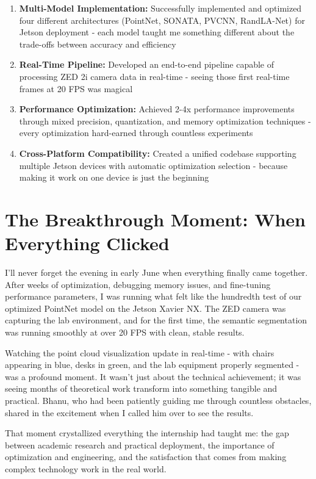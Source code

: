 \documentclass[12pt,a4paper]{report}
\begin{document}
\begin{enumerate}
    \item \textbf{Multi-Model Implementation:} Successfully implemented and optimized four different architectures (PointNet, SONATA, PVCNN, RandLA-Net) for Jetson deployment - each model taught me something different about the trade-offs between accuracy and efficiency
    \item \textbf{Real-Time Pipeline:} Developed an end-to-end pipeline capable of processing ZED 2i camera data in real-time - seeing those first real-time frames at 20 FPS was magical
    \item \textbf{Performance Optimization:} Achieved 2-4x performance improvements through mixed precision, quantization, and memory optimization techniques - every optimization hard-earned through countless experiments
    \item \textbf{Cross-Platform Compatibility:} Created a unified codebase supporting multiple Jetson devices with automatic optimization selection - because making it work on one device is just the beginning
\end{enumerate}

\section{The Breakthrough Moment: When Everything Clicked}

I'll never forget the evening in early June when everything finally came together. After weeks of optimization, debugging memory issues, and fine-tuning performance parameters, I was running what felt like the hundredth test of our optimized PointNet model on the Jetson Xavier NX. The ZED camera was capturing the lab environment, and for the first time, the semantic segmentation was running smoothly at over 20 FPS with clean, stable results.

Watching the point cloud visualization update in real-time - with chairs appearing in blue, desks in green, and the lab equipment properly segmented - was a profound moment. It wasn't just about the technical achievement; it was seeing months of theoretical work transform into something tangible and practical. Bhanu, who had been patiently guiding me through countless obstacles, shared in the excitement when I called him over to see the results.

That moment crystallized everything the internship had taught me: the gap between academic research and practical deployment, the importance of optimization and engineering, and the satisfaction that comes from making complex technology work in the real world.
\end{document}
